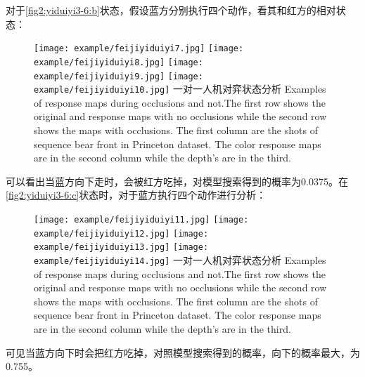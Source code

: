 对于\ref{fig2:yiduiyi3-6:b}状态，假设蓝方分别执行四个动作，看其和红方的相对状态：
\begin{figure}[!htp]
	\centering
	{\texttt{[image: example/feijiyiduiyi7.jpg]}}
	\hspace{0.5em}
	{\texttt{[image: example/feijiyiduiyi8.jpg]}}
	\newline
	\centering
	{\texttt{[image: example/feijiyiduiyi9.jpg]}}
	\hspace{0.5em}
	{\texttt{[image: example/feijiyiduiyi10.jpg]}}
	\bicaption
	{一对一人机对弈状态分析}
	{Examples of response maps during occlusions and not.The first row shows the original and response maps with no occlusions while the second row shows the maps with occlusions. The first column are the shots of sequence bear front in Princeton dataset. The color response maps are in the second column while the depth’s are in the third.}
	\label{fig2:yiduiyi7-10}
\end{figure}
可以看出当蓝方向下走时，会被红方吃掉，对模型搜索得到的概率为0.0375。在\ref{fig2:yiduiyi3-6:c}状态时，对于蓝方执行四个动作进行分析：

\begin{figure}[!htpb]
	\centering
	{\texttt{[image: example/feijiyiduiyi11.jpg]}}
	\hspace{0.5em}
	{\texttt{[image: example/feijiyiduiyi12.jpg]}}
	\newline
	\centering
	{\texttt{[image: example/feijiyiduiyi13.jpg]}}
	\hspace{0.5em}
	{\texttt{[image: example/feijiyiduiyi14.jpg]}}
	\bicaption
	{一对一人机对弈状态分析}
	{Examples of response maps during occlusions and not.The first row shows the original and response maps with no occlusions while the second row shows the maps with occlusions. The first column are the shots of sequence bear front in Princeton dataset. The color response maps are in the second column while the depth’s are in the third.}
	\label{fig2:yiduiyi11-14}
\end{figure}
可见当蓝方向下时会把红方吃掉，对照模型搜索得到的概率，向下的概率最大，为0.755。

